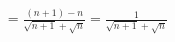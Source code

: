 \documentclass[preview]{standalone}
\begin{document}
\begin{align*}
= \frac{ (n+1) - n }{ \sqrt{n+1} + \sqrt{n} } = \frac{1}{ \sqrt{n+1} + \sqrt{n} }
\end{align*}
\end{document}
